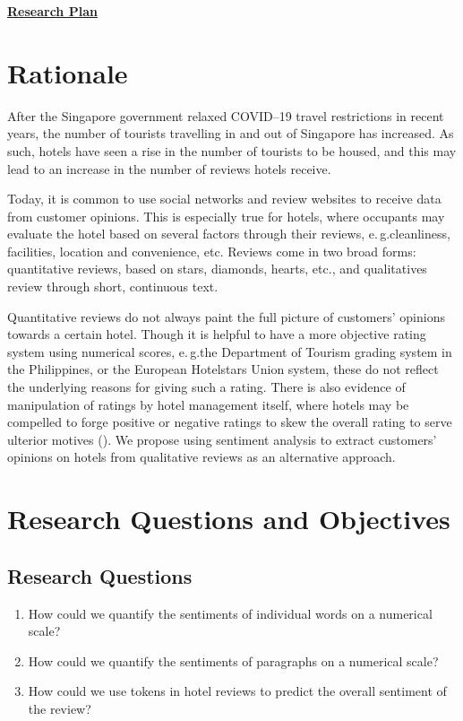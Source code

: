 \documentclass[
	fontsize=12pt,
	paper=a4,
	bibliography=totocnumbered
]{scrartcl}
\newcommand{\eg}{e.\,g.\space}
\begin{document}
\pagestyle{scrheadings}
\onehalfspacing

{
	\noindent
	\LARGE\textbf{\underline{Research Plan}}
}

\section{Rationale}

After the Singapore government relaxed COVID--19 travel restrictions in recent years,
the number of tourists travelling in and out of Singapore has increased.
As such, hotels have seen a rise in the number of tourists to be housed,
and this may lead to an increase in the number of reviews hotels receive.

Today, it is common to use social networks and review websites
to receive data from customer opinions. This is especially true for hotels,
where occupants may evaluate the hotel based on several factors through their
reviews, \eg cleanliness, facilities, location and convenience, etc.
Reviews come in two broad forms: quantitative reviews, based on stars, diamonds, hearts, etc., and
qualitatives review through short, continuous text.

Quantitative reviews do not always paint the full picture of customers'
opinions towards a certain hotel. Though it is helpful to have a more
objective rating system using numerical scores, \eg the Department of Tourism grading system in
the Philippines, or the European Hotelstars Union system,
these do not reflect the underlying reasons for giving such a rating.
There is also evidence of manipulation of ratings by hotel management itself, where hotels may be
compelled to forge positive or negative ratings to skew the overall rating to serve ulterior motives (\cite{tripadvisor}).
We propose using sentiment analysis to extract customers' opinions on hotels from qualitative reviews as an
alternative approach.

\section{Research Questions and Objectives}

\subsection{Research Questions}
\begin{enumerate}
	\item How could we quantify the sentiments of individual words on a numerical scale?
	\item How could we quantify the sentiments of paragraphs on a numerical scale?
	\item How could we use tokens in hotel reviews to predict the overall sentiment of the review?
\end{enumerate}
\end{document}
